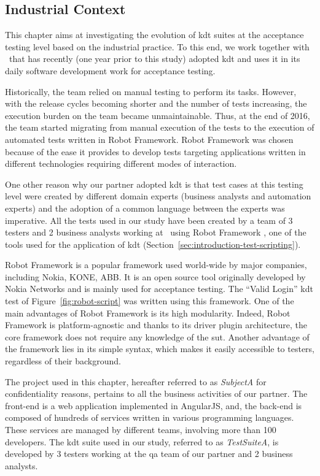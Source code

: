 \subsection{Industrial Context}
\label{sec:evolution-introduction-data}

This chapter aims at investigating the evolution of \gls{kdt} suites at the acceptance testing level based on the industrial practice. To this end, we work together with \BGL\ that has recently (one year prior to this study) adopted \gls{kdt} and uses it in its daily software development work for acceptance testing.

Historically, the team relied on manual testing to perform its tasks. However, with the release cycles becoming shorter and the number of tests increasing, the execution burden on the team became unmaintainable. Thus, at the end of 2016, the team started migrating from manual execution of the tests to the execution of automated tests written in Robot Framework. Robot Framework was chosen because of the ease it provides to develop tests targeting applications written in different technologies requiring different modes of interaction.

One other reason why our partner adopted \gls{kdt} is that test cases at this testing level were created by different domain experts (business analysts and automation experts) and the adoption of a common language between the experts was imperative. All the tests used in our study have been created by a team of 3 testers and 2 business analysts working at \BGL\ using Robot Framework \cite{RobotFramework2020}, one of the tools used for the application of \gls{kdt} (Section~\ref{sec:introduction-test-scripting}).

Robot Framework is a popular framework used world-wide by major companies, including Nokia, KONE, ABB. It is an open source tool originally developed by Nokia Networks and is mainly used for acceptance testing. The ``Valid Login'' \gls{kdt} test of Figure~\ref{fig:robot-script} was written using this framework. One of the main advantages of Robot Framework is its high modularity.  Indeed, Robot Framework is platform-agnostic and thanks to its driver plugin architecture, the core framework does not require any knowledge of the \gls{sut}. Another advantage of the framework lies in its simple syntax, which makes it easily accessible to testers, regardless of their background.

The project used in this chapter, hereafter referred to as \emph{SubjectA} for confidentiality reasons, pertains to all the business activities of our partner. The front-end is a web application implemented in AngularJS, and, the back-end is composed of hundreds of services written in various programming languages. These services are managed by different teams, involving more than 100 developers. The \gls{kdt} suite used in our study, referred to as \emph{TestSuiteA}, is developed by 3 testers working at the \gls{qa} team of our partner and 2 business analysts.

